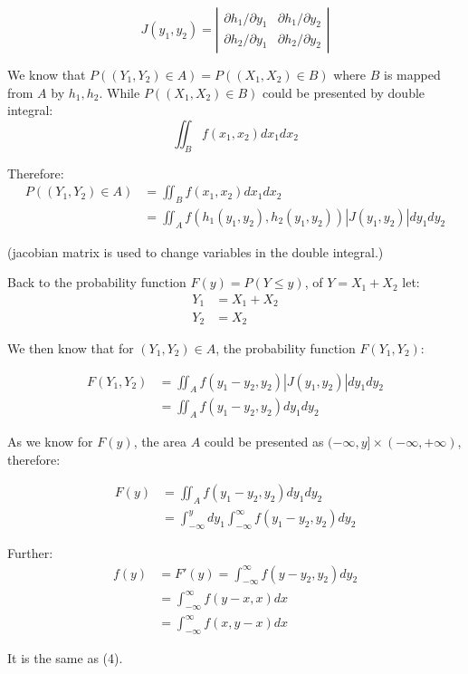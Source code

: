 \documentclass{article}
\begin{document}
\begin{equation}
J(y_1,y_2)=\left|
\begin{array}{ccc}
\partial h_1/\partial y_1 & \partial h_1/\partial y_2 \\
\partial h_2/\partial y_1 & \partial h_2/\partial y_2
\end{array}
\right|
\end{equation}

We know that \(P((Y_1,Y_2)\in A)=P((X_1,X_2)\in B)\) where \(B\) is mapped from \(A\) by \(h_1, h_2\).
While \(P((X_1, X_2)\in B)\) could be presented by double integral:
\begin{equation}
\iint_Bf(x_1, x_2)dx_1dx_2
\end{equation}

Therefore:
\begin{equation}
\begin{split}
P((Y_1,Y_2)\in A)&=\iint_Bf(x_1, x_2)dx_1dx_2\\
&=\iint_Af(h_1(y_1,y_2),h_2(y_1,y_2))|J(y_1,y_2)|dy_1dy_2
\end{split}
\end{equation}

(jacobian matrix is used to change variables in the double integral.)
\vspace{3mm}

Back to the probability function \(F(y)=P(Y\leq y)\), of \(Y=X_1+X_2\) let:
\begin{equation}
\begin{split}
    Y_1&=X_1+X_2\\
    Y_2&=X_2
\end{split}
\end{equation}

We then know that for \((Y_1,Y_2)\in A\), the probability function \(F(Y_1,Y_2)\):

\begin{equation}
\begin{split}
F(Y_1, Y_2)&=\iint_Af(y_1-y_2, y_2)|J(y_1,y_2)|dy_1dy_2\\
&=\iint_Af(y_1-y_2,y_2)dy_1dy_2
\end{split}
\end{equation}

As we know for \(F(y)\), the area \(A\) could be presented as \((-\infty, y]\times(-\infty, +\infty)\),
therefore:

\begin{equation}
\begin{split}
F(y)&=\iint_Af(y_1-y_2,y_2)dy_1dy_2\\
&=\int_{-\infty}^{y}dy_1\int_{-\infty}^{\infty}f(y_1-y_2,y_2)dy_2
\end{split}
\end{equation}

Further:
\begin{equation}
\begin{split}
f(y)&=F'(y)=\int_{-\infty}^{\infty}f(y-y_2,y_2)dy_2\\
&=\int_{-\infty}^{\infty}f(y-x,x)dx\\
&=\int_{-\infty}^{\infty}f(x,y-x)dx
\end{split}
\end{equation}

It is the same as (4).
\end{document}
